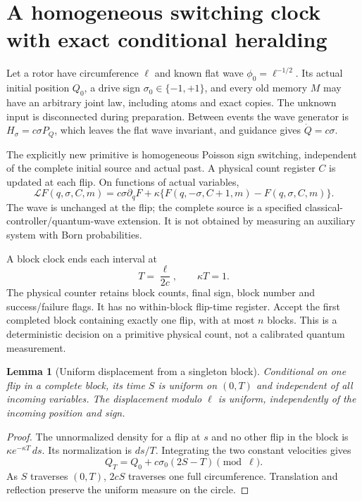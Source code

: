 \documentclass[11pt,oneside,openany]{book}
\newtheorem{lemma}[theorem]{Lemma}
\theoremstyle{definition}
\theoremstyle{remark}\newtheorem{remark}[theorem]{Remark}
\begin{document}
\section{A homogeneous switching clock with exact conditional heralding}

Let a rotor have circumference $\ell$ and known flat wave
$\phi_0=\ell^{-1/2}$. Its actual initial position $Q_0$, a drive sign
$\sigma_0\in\{-1,+1\}$, and every old memory $M$ may have an arbitrary
joint law, including atoms and exact copies. The unknown input is disconnected
during preparation. Between events the wave generator is
$H_\sigma=c\sigma P_Q$, which leaves the flat wave invariant, and guidance
gives $\dot Q=c\sigma$.

The explicitly new primitive is homogeneous Poisson sign switching,
independent of the complete initial source and actual past. A physical
count register $C$ is updated at each flip. On functions of actual variables,
\begin{equation}
 \mathcal L F(q,\sigma,C,m)
 =c\sigma\partial_qF
  +\kappa\{F(q,-\sigma,C+1,m)-F(q,\sigma,C,m)\}.
 \label{prep:rotorgenerator}
\end{equation}
The wave is unchanged at the flip; the complete source is a specified
classical-controller/quantum-wave extension. It is not obtained by measuring
an auxiliary system with Born probabilities.

A block clock ends each interval at
\[
 T=\frac{\ell}{2c},\qquad \kappa T=1.
\]
The physical counter retains block counts, final sign, block number and
success/failure flags. It has no within-block flip-time register.
Accept the first completed block containing exactly one flip, with at most
$n$ blocks. This is a deterministic decision on a primitive physical count,
not a calibrated quantum measurement.

\begin{lemma}[Uniform displacement from a singleton block]
\label{prep:singleton}
Conditional on one flip in a complete block, its time $S$ is uniform
on $(0,T)$ and independent of all incoming variables. The displacement
modulo $\ell$ is uniform, independently of the incoming position and sign.
\end{lemma}
\begin{proof}
The unnormalized density for a flip at $s$ and no other flip in the block
is $\kappa e^{-\kappa T}\,ds$. Its normalization is $ds/T$.
Integrating the two constant velocities gives
\[
 Q_T=Q_0+c\sigma_0(2S-T)\pmod\ell.
\]
As $S$ traverses $(0,T)$, $2cS$ traverses one full circumference.
Translation and reflection preserve the uniform measure on the circle.
\end{proof}
\end{document}
